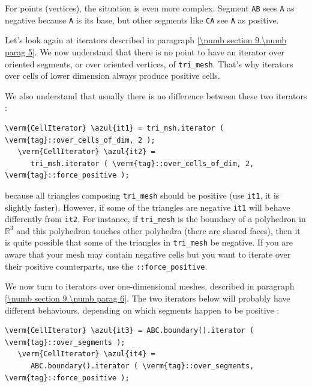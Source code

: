For points (vertices), the situation is even more complex.
Segment {\small\tt AB} sees {\small\tt A} as negative because {\small\tt A} is its base,
but other segments like {\small\tt CA} see {\small\tt A} as positive.

Let's look again at iterators described in paragraph \ref{\numb section 9.\numb parag 5}.
We now understand that there is no point to have an iterator over oriented
segments, or over oriented vertices, of {\small\tt tri\_mesh}.
That's why iterators over cells of lower dimension always produce positive cells.

We also understand that usually there is no difference between these two iterators :

\begin{Verbatim}[commandchars=\\\{\},formatcom=\small\tt,
   baselinestretch=0.94,framesep=2mm                      ]
   \verm{CellIterator} \azul{it1} = tri_msh.iterator ( \verm{tag}::over_cells_of_dim, 2 );
   \verm{CellIterator} \azul{it2} =
      tri_msh.iterator ( \verm{tag}::over_cells_of_dim, 2, \verm{tag}::force_positive );
\end{Verbatim}

\noindent because all triangles composing {\small\tt tri\_mesh} should be positive
(use {\small\tt it1}, it is slightly faster).
However, if some of the triangles are negative {\small\tt it1} will behave differently from
{\small\tt it2}.
For instance, if {\small\tt tri\_mesh} is the boundary of a polyhedron in $ \mathbb{R}^3 $
and this polyhedron touches other polyhedra (there are shared faces), then it is
quite possible that some of the triangles in {\small\tt tri\_mesh} be negative.
If you are aware that your mesh may contain negative cells but
you want to iterate over their positive counterparts, use the {\small\tt {}::force\_positive}.

We now turn to iterators over one-dimensional meshes, described in paragraph
\ref{\numb section 9.\numb parag 6}.
The two iterators below will probably have different behaviours,
depending on which segments happen to be positive :

\begin{Verbatim}[commandchars=\\\{\},formatcom=\small\tt,
   baselinestretch=0.94,framesep=2mm                      ]
   \verm{CellIterator} \azul{it3} = ABC.boundary().iterator ( \verm{tag}::over_segments );
   \verm{CellIterator} \azul{it4} =
      ABC.boundary().iterator ( \verm{tag}::over_segments, \verm{tag}::force_positive );
\end{Verbatim}

